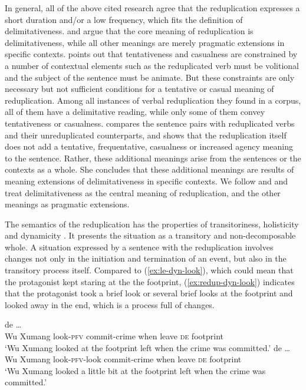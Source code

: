 In general, all of the above cited research agree that the reduplication expresses a short duration and/or a low frequency, which fits the definition of delimitativeness.
\citet[152--154]{XiaoMcEnery2004} and \citet{Yang2003} argue that the core meaning of reduplication is delimitativeness, 
while all other meanings are merely pragmatic extensions  in specific contexts.
\citet[152--154]{XiaoMcEnery2004} points out that tentativeness and casualness are constrained by a number of contextual elements 
such as the reduplicated verb must be volitional and the subject of the sentence must be animate.
But these constraints are only necessary but not sufficient conditions for a tentative or casual meaning of reduplication.
Among all instances of verbal reduplication they found in a corpus, all of them have a delimitative reading, while only some of them convey tentativeness or casualness.
\citet{Yang2003} compares the sentence pairs with reduplicated verbs and their unreduplicated counterparts,
and shows that the reduplication itself does not add a tentative, frequentative, casualness or increased agency meaning to the sentence.
Rather, these additional meanings arise from the sentences or the contexts as a whole.
She concludes that these additional meanings are results of meaning extensions of delimitativeness in specific contexts.
We follow \citet{XiaoMcEnery2004} and \citet{Yang2003} and treat delimitativeness as the central meaning of reduplication,
and the other meanings as pragmatic extensions.

The semantics of the reduplication has the properties of transitoriness,  holisticity  and dynamicity \citetext{\citealp[70--79]{Dai1997}; \citealp[155--159]{XiaoMcEnery2004}}.
It presents the situation as a  transitory and non\hyp{}decomposable whole.
A situation expressed by a sentence with the reduplication involves changes not only in the initiation and termination of an event, but also in the transitory process itself.
Compared to (\ref{ex:le-dyn-look}), which could mean that the protagonist kept staring at the the footprint,
(\ref{ex:redup-dyn-look}) indicates that the protagonist took a brief look or several brief looks at the footprint and looked away in the end, which is a process full of changes.

\settowidth{}

\ea
  \ea\label{ex:le-dyn-look}
    \gll {}      de  \ldots\\ 
    Wu Xumang look-\textsc{pfv} commit-crime when leave \textsc{de} footprint\\ 
    \glt `Wu Xumang looked at the footprint left when the crime was committed.'
  \ex\label{ex:redup-dyn-look}
    \gll  {}      de  \ldots\\
    Wu Xumang look-\textsc{pfv}-look commit-crime when leave \textsc{de} footprint\\ 
    \glt `Wu Xumang looked a little bit at the footprint left when the crime was committed.'
  \z
\z

